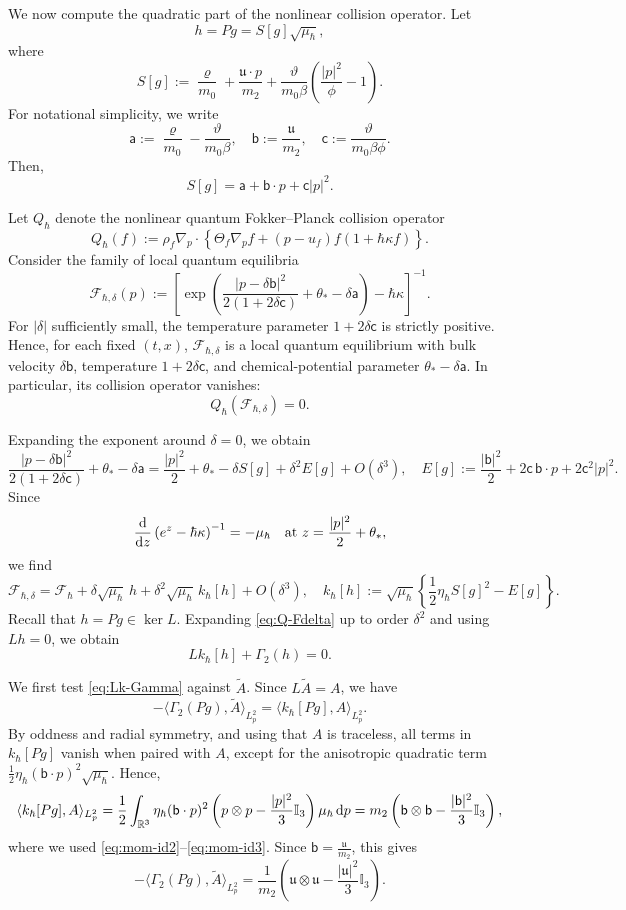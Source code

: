 \documentclass[10pt,reqno]{amsart}
\numberwithin{equation}{section}
\newcommand{\lt}{\left}
\newcommand{\rt}{\right}
\newcommand{\lal}{\langle}
\newcommand{\ral}{\rangle}
\newcommand{\mR}{\mathbb{R}}
\newcommand{\mcF}{\mathcal{F}}
\newcommand{\vrh}{\varrho}
\newcommand{\vth}{\vartheta}
\newcommand{\mfu}{\mathfrak{u}}
\newcommand{\intr}{\int_{\mR^3}}
\newcommand{\bq}{\begin{equation}}
\newcommand{\eq}{\end{equation}}
\newcommand{\calF}{\mathcal F}
\newcommand{\rdp}{\textnormal{d}p}
\begin{document}
We now compute the quadratic part of the nonlinear collision operator. Let
\[
h = P g = S[g]\sqrt{\mu_\hbar},
\]
where
\[
S[g] := \frac{\vrh}{m_0 } + \frac{\mfu\cdot p}{m_2 } + \frac{\vth}{m_0\beta} \lt( \frac{|p|^2}{\phi } - 1 \rt).
\]
For notational simplicity, we write
\[
\mathsf{a} := \frac{\vrh}{m_0 } - \frac{\vth}{m_0\beta}, \quad \mathsf{b} := \frac{\mfu}{m_2 }, \quad \mathsf{c} := \frac{\vth}{m_0\beta\phi }.
\]
Then,
\[
S[g] = \mathsf a + \mathsf b\cdot p + \mathsf c |p|^2.
\]

Let $Q_\hbar$ denote the nonlinear quantum Fokker--Planck collision operator 
\[ 
Q_\hbar(f) := \rho_f\nabla_p\cdot\lt\{ \Theta_f\nabla_p f+(p-u_f)f(1+\hbar\kappa f) \rt\}. 
\]
Consider the family of local quantum equilibria
\[
\mcF_{\hbar,\delta}(p) := \lt[ \exp \lt( \frac{|p-\delta \mathsf b|^2}{2(1+2\delta \mathsf c)} + \theta_* - \delta \mathsf a \rt) - \hbar\kappa \rt]^{-1}.
\]
For $|\delta|$ sufficiently small, the temperature parameter $1 + 2 \delta \mathsf c$ is strictly positive. Hence, for each fixed $(t,x)$, $\mcF_{\hbar,\delta}$ is a local quantum equilibrium with bulk velocity $\delta \mathsf{b}$, temperature $1+2\delta \mathsf c$, and chemical-potential parameter $\theta_*-\delta \mathsf{a}$. In particular, its collision operator vanishes:
\bq \label{eq:Q-Fdelta}
Q_\hbar \lt( \mcF_{\hbar,\delta} \rt) = 0.
\eq

Expanding the exponent around $\delta=0$, we obtain
\[
\frac{|p-\delta \mathsf b|^2}{2(1+2\delta \mathsf c)} + \theta_* - \delta \mathsf a = \frac{|p|^2}{2} + \theta_* - \delta S[g] + \delta^2 E[g] + O(\delta^3), \quad E[g] := \frac{|\mathsf b|^2}{2} + 2\mathsf c\,\mathsf b\cdot p + 2\mathsf c^2|p|^2.
\]
Since
\[
\frac{\rm d}{\textnormal{d}z} \lt( e^z - \hbar\kappa \rt)^{-1} = - \mu_\hbar \quad \text{at } z = \frac{|p|^2}{2} + \theta_*,
\]
we find
\[
\mcF_{\hbar,\delta} = \calF_\hbar + \delta \sqrt{\mu_\hbar}\,h + \delta^2 \sqrt{\mu_\hbar}\, k_\hbar[h] + O( \delta^3), \quad k_\hbar[h] := \sqrt{\mu_\hbar} \lt\{ \frac{1}{2} \eta_\hbar S[g]^2 - E[g] \rt\}.
\]
Recall that $h = P g \in \ker L$. Expanding \eqref{eq:Q-Fdelta} up to order $\delta^2$ and using $L  h = 0$, we obtain
\bq\label{eq:Lk-Gamma}
L  k_\hbar[h] + \Gamma_2  \lt(h \rt) = 0.
\eq

We first test \eqref{eq:Lk-Gamma} against $\widetilde A $. Since $L \widetilde A  = A$, we have
\[
-\lal \Gamma_2 (P g), \widetilde A  \ral_{L^2_p} = \lal k_\hbar[P g], A  \ral_{L^2_p}.
\]
By oddness and radial symmetry, and using that $A$ is traceless, all terms in $k_\hbar[Pg]$ vanish when paired with $A$, except for the anisotropic quadratic term $\frac12\eta_\hbar(\mathsf b\cdot  p)^2 \sqrt{\mu_\hbar} $. Hence,
\[
\lal k_\hbar[P g],A\ral_{L^2_p} = \frac12 \intr  \eta_\hbar (\mathsf b\cdot p)^2 \lt(p\otimes p-\frac{|p|^2}{3}\mathbb I_3\rt) \mu_\hbar\,\rdp  = m_2\lt(\mathsf b\otimes \mathsf b-\frac{|\mathsf b|^2}{3}\mathbb I_3\rt),
\]
where we used \eqref{eq:mom-id2}--\eqref{eq:mom-id3}. Since $\mathsf b=\frac{\mfu}{m_2}$, this gives
\bq\label{eq:Gamma2-A-fin}
-\lal \Gamma_2 (P g), \widetilde A  \ral_{L^2_p} = \frac{1}{m_2 } \lt( \mfu\otimes\mfu - \frac{|\mfu|^2}{3} \mathbb I_3 \rt).
\eq
\end{document}
